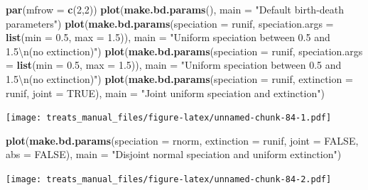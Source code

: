 \documentclass[
]{book}
\newenvironment{Shaded}{\begin{snugshade}}{\end{snugshade}}
\newcommand{\CharTok}[1]{\textcolor[rgb]{0.31,0.60,0.02}{#1}}
\newcommand{\DataTypeTok}[1]{\textcolor[rgb]{0.13,0.29,0.53}{#1}}
\newcommand{\DecValTok}[1]{\textcolor[rgb]{0.00,0.00,0.81}{#1}}
\newcommand{\FloatTok}[1]{\textcolor[rgb]{0.00,0.00,0.81}{#1}}
\newcommand{\KeywordTok}[1]{\textcolor[rgb]{0.13,0.29,0.53}{\textbf{#1}}}
\newcommand{\NormalTok}[1]{#1}
\newcommand{\OtherTok}[1]{\textcolor[rgb]{0.56,0.35,0.01}{#1}}
\newcommand{\StringTok}[1]{\textcolor[rgb]{0.31,0.60,0.02}{#1}}
\begin{document}
\begin{Shaded}
\begin{Highlighting}[]
\KeywordTok{par}\NormalTok{(}\DataTypeTok{mfrow =} \KeywordTok{c}\NormalTok{(}\DecValTok{2}\NormalTok{,}\DecValTok{2}\NormalTok{))}
\KeywordTok{plot}\NormalTok{(}\KeywordTok{make.bd.params}\NormalTok{(), }\DataTypeTok{main =} \StringTok{"Default birth{-}death parameters"}\NormalTok{)}
\KeywordTok{plot}\NormalTok{(}\KeywordTok{make.bd.params}\NormalTok{(}\DataTypeTok{speciation =}\NormalTok{ runif,}
               \DataTypeTok{speciation.args =} \KeywordTok{list}\NormalTok{(}\DataTypeTok{min =} \FloatTok{0.5}\NormalTok{, }\DataTypeTok{max =} \FloatTok{1.5}\NormalTok{)),}
     \DataTypeTok{main =} \StringTok{"Uniform speciation between 0.5 and 1.5}\CharTok{\textbackslash{}n}\StringTok{(no extinction)"}\NormalTok{)}
\KeywordTok{plot}\NormalTok{(}\KeywordTok{make.bd.params}\NormalTok{(}\DataTypeTok{speciation =}\NormalTok{ runif,}
                    \DataTypeTok{speciation.args =} \KeywordTok{list}\NormalTok{(}\DataTypeTok{min =} \FloatTok{0.5}\NormalTok{, }\DataTypeTok{max =} \FloatTok{1.5}\NormalTok{)),}
     \DataTypeTok{main =} \StringTok{"Uniform speciation between 0.5 and 1.5}\CharTok{\textbackslash{}n}\StringTok{(no extinction)"}\NormalTok{)}
\KeywordTok{plot}\NormalTok{(}\KeywordTok{make.bd.params}\NormalTok{(}\DataTypeTok{speciation =}\NormalTok{ runif, }\DataTypeTok{extinction =}\NormalTok{ runif, }\DataTypeTok{joint =} \OtherTok{TRUE}\NormalTok{),}
     \DataTypeTok{main =} \StringTok{"Joint uniform speciation and extinction"}\NormalTok{)}
\end{Highlighting}
\end{Shaded}

\texttt{[image: treats\_manual\_files/figure-latex/unnamed-chunk-84-1.pdf]}

\begin{Shaded}
\begin{Highlighting}[]
\KeywordTok{plot}\NormalTok{(}\KeywordTok{make.bd.params}\NormalTok{(}\DataTypeTok{speciation =}\NormalTok{ rnorm, }\DataTypeTok{extinction =}\NormalTok{ runif,}
                    \DataTypeTok{joint =} \OtherTok{FALSE}\NormalTok{, }\DataTypeTok{abs =} \OtherTok{FALSE}\NormalTok{),}
     \DataTypeTok{main =} \StringTok{"Disjoint normal speciation and uniform extinction"}\NormalTok{)}
\end{Highlighting}
\end{Shaded}

\texttt{[image: treats\_manual\_files/figure-latex/unnamed-chunk-84-2.pdf]}
\end{document}
